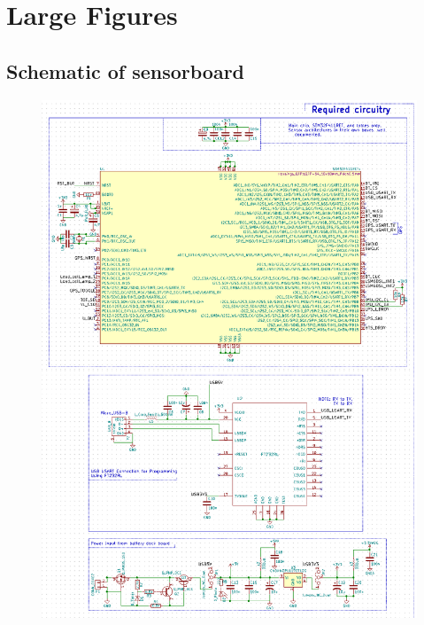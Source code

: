 \section{Large Figures}\label{sec:app}

\subsection{Schematic of sensorboard}\label{app:schemmain}
\begin{figure}[h]
	\centering
    \includegraphics[width=.91\linewidth]{Figures/schem_r3_a.png}
	\label{fig:schr3a}
\end{figure}
